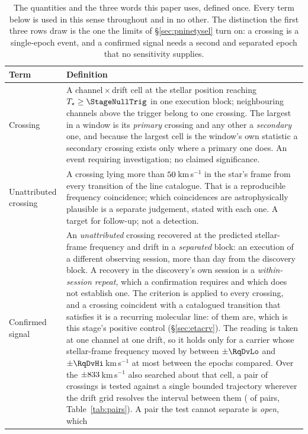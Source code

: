 \begin{table}
\centering
\caption{The quantities and the three words this paper uses, defined once.
Every term below is used in this sense throughout and in no other. The
distinction the first three rows draw is the one the limits of
\S\ref{sec:pninetysel} turn on: a crossing is a single-epoch event, and a
confirmed signal needs a second and separated epoch that no sensitivity
supplies.}
\label{tab:quantities}
\small
\begin{tabular}{@{}p{}p{}@{}}
\hline
Term & Definition \\
\hline
Crossing &
A channel\,$\times$\,drift cell at the stellar position reaching
$T_\star\geq\StageNullTrig$ in one execution block; neighbouring channels
above the trigger belong to one crossing. The largest in a window is its
\emph{primary} crossing and any other a \emph{secondary} one, and because the
largest cell is the window's own statistic a secondary crossing exists only
where a primary one does. An event requiring investigation; no claimed
significance. \\
Unattributed crossing &
A crossing lying more than $50$\,km\,s$^{-1}$ in the star's frame
from every transition of the line catalogue. That is a reproducible frequency
coincidence; which coincidences are astrophysically plausible is a separate
judgement, stated with each one. A target for follow-up; not a detection. \\
Confirmed signal &
An \emph{unattributed} crossing recovered at the predicted stellar-frame
frequency and drift in a \emph{separated} block: an execution of a different
observing session, more than \EpSep{} day from the discovery block. A
recovery in the discovery's own session is a \emph{within-session repeat},
which a confirmation requires and which does not establish one. The criterion is
applied to every crossing, and a crossing coincident with a catalogued
transition that satisfies it is a recurring molecular line:
\MkAttrRecur{} of them are, which is this stage's positive control
(\S\ref{sec:etacrv}). The reading is taken at one channel at one drift, so it holds only for a
carrier whose stellar-frame frequency moved by between $\pm\RqDvLo$ and
$\pm\RqDvHi$\,km\,s$^{-1}$ at most between the epochs compared. Over the
$\pm833$\,km\,s$^{-1}$ also searched about that cell, a pair of
crossings is tested against a single bounded trajectory wherever the drift
grid resolves the interval between them (\TjNPower{} of \TjNPair{} pairs,
Table~\ref{tab:pairs}). A pair the test cannot separate is \emph{open}, which

\end{tabular}
\end{table}
